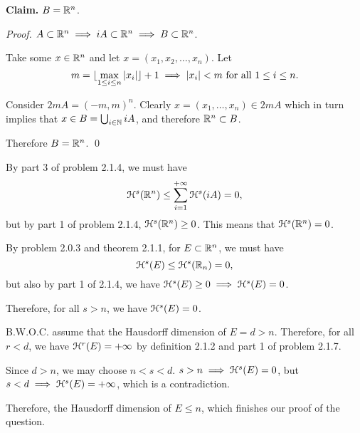 \textbf{Claim.} \(B = \mathbb{R}^n\).

\textit{Proof.} \(A \subset \mathbb{R}^n \implies iA \subset \mathbb{R}^n \implies B \subset \mathbb{R}^n\).

Take some \(x \in \mathbb{R}^n\) and let \(x = (x_1, x_2, \ldots, x_n)\). Let
\[
m = \lfloor\max_{1 \leq i \leq n} |x_i|\rfloor + 1 \implies |x_i| < m \text{ for all } 1 \leq i \leq n.
\]

Consider \(2mA = (-m, m)^n\). Clearly \(x = \left(x_1, \ldots, x_n\right) \in 2mA\) which in turn implies that \(x \in B = \bigcup_{i \in \mathbb{N}} iA\), and therefore \(\mathbb{R}^n \subset B\).

Therefore \(B = \mathbb{R}^n\). \qed

By part 3 of problem 2.1.4, we must have
\[
\mathcal{H}^s (\mathbb{R}^n) \leq \sum_{i = 1}^{+\infty} \mathcal{H}^s(iA) = 0,
\]
but by part 1 of problem 2.1.4, \(\mathcal{H}^s (\mathbb{R}^n) \geq 0\). This means that \(\mathcal{H}^s(\mathbb{R}^n) = 0\).

By problem 2.0.3 and theorem 2.1.1, for \(E \subset \mathbb{R}^n\), we must have
\[
\mathcal{H}^s(E) \leq \mathcal{H}^s (\mathbb{R}_n) = 0,
\]
but also by part 1 of 2.1.4, we have \(\mathcal{H}^s(E) \geq 0 \implies \mathcal{H}^s(E) = 0\).

Therefore, for all \(s > n\), we have \(\mathcal{H}^s(E) = 0\).

B.W.O.C. assume that the Hausdorff dimension of \(E = d > n\). Therefore, for all \(r < d\), we have \(\mathcal{H}^r(E) = +\infty\) by definition 2.1.2 and part 1 of problem 2.1.7. 

Since \(d > n\), we may choose \(n < s < d\). \(s > n \implies \mathcal{H}^s(E) = 0\), but \(s < d \implies \mathcal{H}^s(E) = +\infty\), which is a contradiction.

Therefore, the Hausdorff dimension of \(E \leq n\), which finishes our proof of the question.